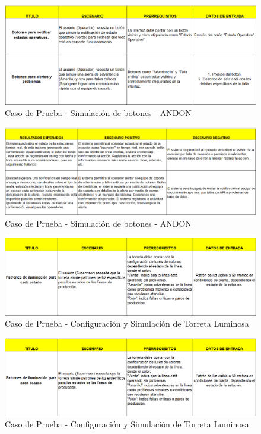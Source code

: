 \documentclass[12pt,letterpaper,spanish, xcolor=table]{report}
\numberwithin{figure}{subsection}
\begin{document}
	\begin{figure}[H]
		\centering
		\includegraphics[width=1.0\textwidth]
		{Imagenes/PathAyuda/CPBotonesAndon.png}
		\caption{Caso de Prueba - Simulación de botones - ANDON
		}\label{a2}
	\end{figure}
	
	\begin{figure}[H]
		\centering
		\includegraphics[width=1.0\textwidth]
		{Imagenes/PathAyuda/CPBotonesAndon2.png}
		\caption{Caso de Prueba - Simulación de botones - ANDON
		}\label{a2}
	\end{figure}
	
	\begin{figure}[H]
		\centering
		\includegraphics[width=1.0\textwidth]
		{Imagenes/PathAyuda/CPTorreta.png}
		\caption{Caso de Prueba - Configuración y Simulación de Torreta Luminosa
		}\label{a2}
	\end{figure}
	
	\begin{figure}[H]
		\centering
		\includegraphics[width=1.0\textwidth]
		{Imagenes/PathAyuda/CPTorreta.png}
		\caption{Caso de Prueba - Configuración y Simulación de Torreta Luminosa
		}\label{a2}
	\end{figure}
	
\end{document}

